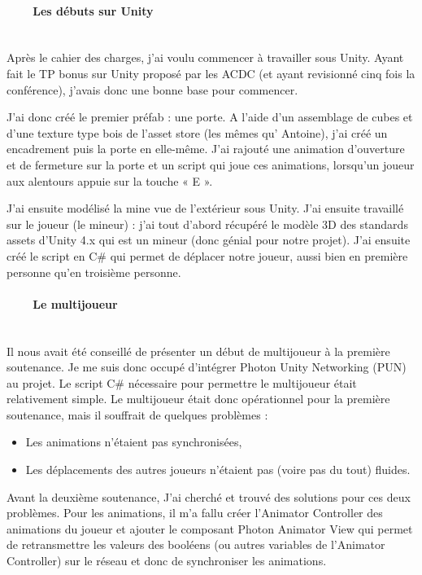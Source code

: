 \documentclass[titlepage, 13px, a4paper]{report}
\begin{document}
\paragraph{~~~~Les débuts sur Unity} \hspace{0pt}     \\
Après le cahier des charges, j’ai voulu commencer à travailler sous Unity. Ayant fait le TP bonus sur 
Unity proposé par les ACDC (et ayant revisionné cinq fois la conférence), j’avais donc une bonne base pour commencer.

J’ai donc créé le premier préfab : une porte.
A l’aide d’un assemblage de cubes et d’une texture type bois de l’asset store (les mêmes qu' Antoine), 
j’ai créé un encadrement puis la porte en elle-même. J’ai rajouté une animation d’ouverture et de fermeture 
sur la porte et un script qui joue ces animations, lorsqu’un joueur aux alentours appuie sur la touche « E ».

J’ai ensuite modélisé la mine vue de l’extérieur sous Unity.
J’ai ensuite travaillé sur le joueur (le mineur) : j’ai tout d’abord récupéré le modèle 3D des standards assets d’Unity 4.x 
qui est un mineur (donc génial pour notre projet). J’ai ensuite créé le script en C\# qui permet de déplacer 
notre joueur, aussi bien en première personne qu’en troisième personne. \\


\paragraph{~~~~Le multijoueur} \hspace{0pt} \\
Il nous avait été conseillé de présenter un début de multijoueur à la première soutenance. 
Je me suis donc occupé d’intégrer Photon Unity Networking (PUN) au projet.
Le script C\# nécessaire pour permettre le multijoueur était relativement simple.
Le multijoueur était donc opérationnel pour la première soutenance, mais il souffrait de quelques problèmes : \\
{\begin{itemize}
	 \item Les animations n’étaient pas synchronisées,
	 \item Les déplacements des autres joueurs n’étaient pas (voire pas du tout) fluides. \\
\end{itemize}}

Avant la deuxième soutenance, J'ai cherché et trouvé des solutions pour ces deux problèmes.
Pour les animations, il m’a fallu créer l’Animator Controller des animations du joueur et ajouter 
le composant Photon Animator View qui permet de retransmettre les valeurs des booléens (ou autres variables 
de l’Animator Controller) sur le réseau et donc de synchroniser les animations. \\
\end{document}
